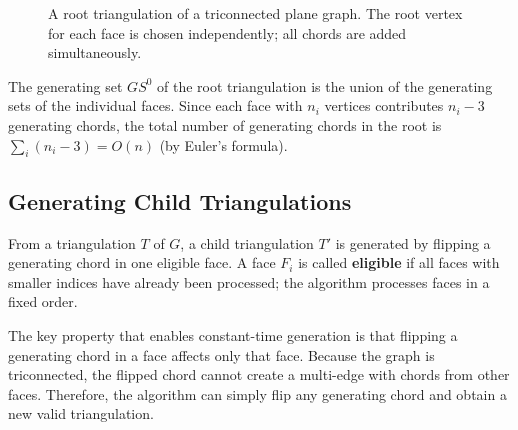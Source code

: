 \begin{figure}[htbp]
    \centering
    \caption{A root triangulation of a triconnected plane graph. The root vertex for each face is chosen independently; all chords are added simultaneously.}
    \label{fig:paper_root}
\end{figure}

The generating set \(GS^0\) of the root triangulation is the union of the generating sets of the individual faces. 
Since each face with \(n_i\) vertices contributes \(n_i - 3\) generating chords, the total number of generating chords in the root is \(\sum_i (n_i - 3) = O(n)\) (by Euler’s formula).

\subsection{Generating Child Triangulations}
\label{subsec:paper_child}

From a triangulation \(T\) of \(G\), a child triangulation \(T'\) is generated by flipping a generating chord in one eligible face. 
A face \(F_i\) is called \textbf{eligible} if all faces with smaller indices have already been processed; the algorithm processes faces in a fixed order.

The key property that enables constant-time generation is that flipping a generating chord in a face affects only that face. 
Because the graph is triconnected, the flipped chord cannot create a multi-edge with chords from other faces. 
Therefore, the algorithm can simply flip any generating chord and obtain a new valid triangulation.


